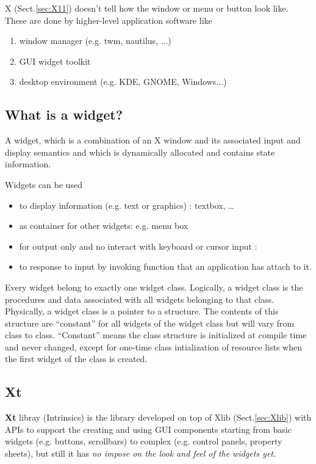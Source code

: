 X (Sect.\ref{sec:X11}) doesn't tell how the window or menu or button look like.
These are done by higher-level application software like 
\begin{enumerate}
\item window manager (e.g. twm, nautilus, ...)
\item GUI widget toolkit
\item desktop environment (e.g. KDE, GNOME, Windows...)
\end{enumerate}


\subsection{What is a widget?}
\label{sec:widget}

A widget, which is a combination of an X window and its associated input and
display semantics and which is dynamically allocated and contains state
information.

Widgets can be used
\begin{itemize}
  \item to display information (e.g. text or graphics) : textbox, \ldots
  
  \item as container for other widgets: e.g. menu box
  
  \item for output only and no interact with keyboard or cursor input :
  
  \item to response to input by invoking function that an application has attach
  to it.
\end{itemize}

Every widget belong to exactly one widget class. Logically, a widget class is
the procedures and data associated with all widgets belonging to that class.
Physically, a widget class is a pointer to a structure. The contents of this
structure are ``constant'' for all widgets of the widget class but will vary from
class to class. ``Constant'' means the class structure is initialized at compile
time and never changed, except for one-time class intialization of resource
lists when the first widget of the class is created.


\subsection{Xt}
\label{sec:Xt}

{\bf Xt} libray (Intrinsics) is the library developed on top of Xlib
(Sect.\ref{sec:Xlib}) with APIs to support the creating and using GUI components
starting from basic widgets (e.g. buttons, scrollbars) to complex (e.g. control
panels, property sheets), but still it has {\it no impose on the look and feel
of the widgets yet}.

